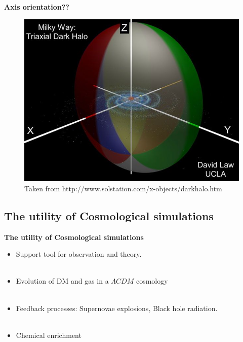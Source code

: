 \documentclass[xcolor=dvipsnames]{beamer}
\begin{document}
\begin{frame}
\centering
\textbf{Axis orientation??}
\begin{figure}[c]
\includegraphics[width=0.6\linewidth]{./pics/MWDMHalo.jpg}
\caption{\tiny Taken from http://www.solstation.com/x-objects/darkhalo.htm}
\end{figure}

\end{frame}

\subsection{The utility of Cosmological simulations}
\begin{frame}
\centering
\LARGE
\textbf{The utility of Cosmological simulations}
\normalsize
\end{frame}

\begin{frame}

\begin{itemize}
\item Support tool for observation and theory.\\~\\

\item Evolution of DM and gas in a $\Lambda CDM$ cosmology\\~\\

\item Feedback processes: Supernovae explosions, Black hole radiation.\\~\\

\item Chemical enrichment\\~\\

\end{itemize}

\end{frame}
\end{document}
